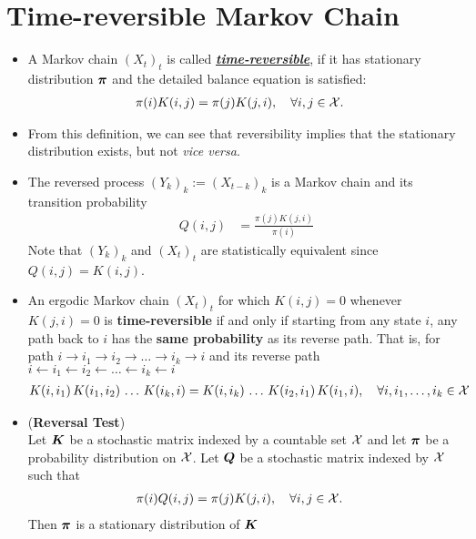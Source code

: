 \documentclass[11pt]{article}
\begin{document}
\section{Time-reversible Markov Chain}
\begin{itemize}
\item \begin{definition}
A Markov chain $(X_t)_t$ is called \underline{\emph{\textbf{time-reversible}}}, if it has stationary distribution $\boldsymbol{\pi}$ and the detailed balance equation is satisfied:
\begin{align}
\pi(i)K(i, j) &=  \pi(j)K(j, i),\quad \forall i, j\in {\mathcal X}.  \label{eqn: mc_detailed_balance_eqn_time_rev}
\end{align}
\end{definition}

\item From this definition, we can see that reversibility implies that the stationary distribution exists, but not \emph{vice versa}. 

\item The reversed process $(Y_{k})_k := (X_{t-k})_{k}$ is a Markov chain and its transition probability 
\begin{align}
Q(i,j) &= \frac{\pi(j)K(j,i)}{\pi(i)} \label{eqn: mc_rev_kernel}
\end{align} Note that $(Y_{k})_k$ and $(X_t)_t$ are statistically equivalent since $Q(i,j) = K(i,j)$.

\item 
\begin{theorem}
An ergodic Markov chain $(X_t)_t$ for which $K(i,j) =0$ whenever $K(j, i) = 0$ is \textbf{time-reversible} if and only if starting from any state $i$, any path back to $i$ has the \textbf{same probability} as its reverse path. That is, for path $i \rightarrow i_1\rightarrow i_2 \rightarrow \ldots \rightarrow i_k \rightarrow i$ and its reverse path $i \leftarrow i_1 \leftarrow i_2 \leftarrow \ldots  \leftarrow i_k \leftarrow i$
\begin{align}
K(i, i_1)\,K(i_1, i_2)\,\ldots\,K(i_k, i) &= K(i, i_k)\,\ldots\,K(i_2, i_{1})\,K(i_1, i), \quad \forall i,i_1,\ldots, i_k\in {\mathcal X} \label{eqn: mc_path_rev}
\end{align} 
\end{theorem}

\item 
\begin{theorem} (\textbf{Reversal Test})\\
Let $\boldsymbol{K}$ be a stochastic matrix indexed by a countable set ${\mathcal X}$ and let $\boldsymbol{\pi}$ be a probability distribution on ${\mathcal X}$. Let $\boldsymbol{Q}$ be a stochastic matrix indexed by ${\mathcal X}$ such that
\begin{align}
\pi(i)Q(i, j) &=  \pi(j)K(j, i),\quad \forall i, j\in {\mathcal X}.  \label{eqn: mc_time_rev_test}
\end{align}  Then $\boldsymbol{\pi}$ is a stationary distribution of $\boldsymbol{K}$
\end{theorem}


\end{itemize}
\end{document}
